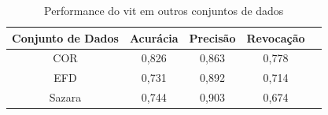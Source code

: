 \begin{table}[tb]
\caption{\label{tab:vitperformance} Performance do \acrshort{vit} em outros conjuntos de dados}
\begin{center}
\begin{tabular}{c|cccc}
\toprule
 Conjunto de Dados & Acurácia & Precisão & Revocação \\
\midrule
     COR & 0,826 & 0,863 & 0,778 \\
     EFD & 0,731 & 0,892 & 0,714 \\
     Sazara & 0,744 & 0,903 & 0,674 \\
\bottomrule
\end{tabular}
\end{center}
\end{table}
